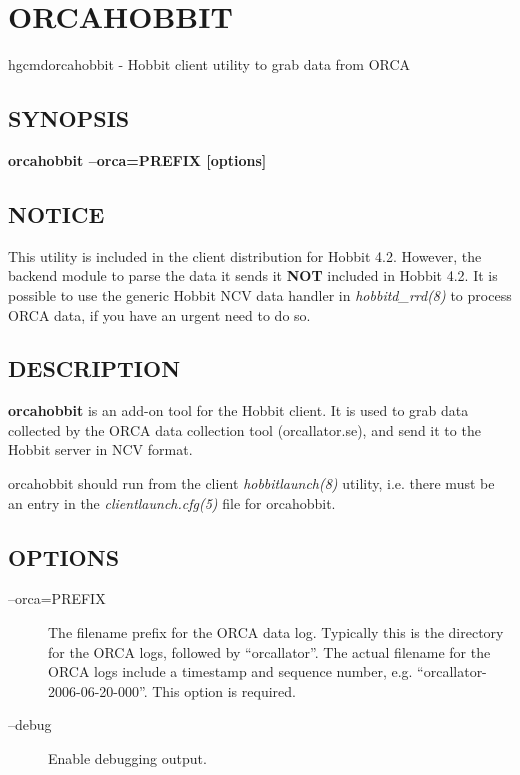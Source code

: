  
  

%


\newpage
\section{ORCAHOBBIT}

hgcmd{orcahobbit} - Hobbit client utility to grab data from ORCA

 \subsection{SYNOPSIS}
\textbf{orcahobbit --orca=PREFIX [options]}


 
\subsection{NOTICE}
 This utility is included in the client distribution for Hobbit 4.2. However, the backend module to parse the data it sends it \textbf{NOT}
 included in Hobbit 4.2. It is possible to use the generic Hobbit NCV data handler in \emph{hobbitd\_rrd(8)}
 to process ORCA data, if you have an urgent need to do so. 

 
\subsection{DESCRIPTION}
\textbf{orcahobbit}
 is an add-on tool for the Hobbit client. It is used to grab data collected by the ORCA data collection tool (orcallator.se), and send it to the Hobbit server in NCV format. 

  orcahobbit should run from the client \emph{hobbitlaunch(8)}
 utility, i.e. there must be an entry in the \emph{clientlaunch.cfg(5)}
 file for orcahobbit. 


 
\subsection{OPTIONS}
\begin{description}
\item[--orca=PREFIX] The filename prefix for the ORCA data log. Typically this is the directory for the ORCA logs, followed by ``orcallator''. The actual filename for the ORCA logs include a timestamp and sequence number, e.g. ``orcallator-2006-06-20-000''. This option is required. 

 

\item[--debug] Enable debugging output. 

 


\end{description}

